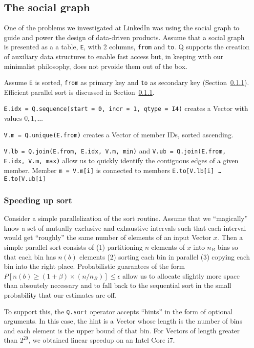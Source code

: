 \subsection{The social graph}
\label{social_graph}

One of the problems we investigated at LinkedIn was using the social graph to
guide and power the design of data-driven products.
Assume that a social graph is presented as a 
a table, {\tt E}, with 2 columns, {\tt from} and {\tt to}. Q supports the
creation of auxiliary data structures to enable fast access but, in keeping with
our minimalist philosophy, does not prvoide them out of the box.
\be
\item Assume {\tt E} is sorted, {\tt from} as primary key and {\tt to} as
  secondary key (Section~\ref{par_sort}). Efficient parallel sort is discussed
  in Section~\ref{par_sort}.
\item 
  {\tt E.idx = Q.sequence({start = 0, incr = 1, qtype = I4})}
creates a Vector with values \(0, 1, \ldots\) 
\item {\tt V.m = Q.unique(E.from)} creates a Vector of 
member IDs, sorted ascending. 
\item {\tt V.lb = Q.join(E.from, E.idx, V.m, min)}
and {\tt V.ub = Q.join(E.from, E.idx, V.m, max)}
allow us to quickly identify the contiguous edges of a given member. Member
{\tt m = V.m[i]} is connected to members {\tt E.to[V.lb[i] \ldots E.to[V.ub[i]}
\ee


\subsubsection{Speeding up sort}
\label{par_sort}
Consider a simple parallelization of the sort routine. Assume that we 
``magically'' know a set of mutually exclusive and exhaustive intervals such
that each interval would get ``roughly'' the same number of elements of an input
Vector \(x\). Then a simple parallel sort consists of 
(1) partitioning \(n\) elements of \(x\) into \(n_B\) bins so that each bin has
\(n(b)\) elements
(2) sorting each bin in parallel
(3) copying each bin into the right place. Probabilistic guarantees
of the form \(P[n(b) \geq (1+\beta) \times(n/n_B)] \leq \epsilon\) 
allow us to allocate slightly more space than absoutely necessary and to 
fall back to the sequential sort in the small probability that our estimates are off.

To support this, the {\tt Q.sort} operator accepts ``hints'' in the form of
optional arguments. In this case, the hint is a Vector whose length is the
number of bins and each element is the upper bound of that bin. For Vectors of
length greater than \(2^{20}\), we obtained linear speedup on an Intel Core i7.

